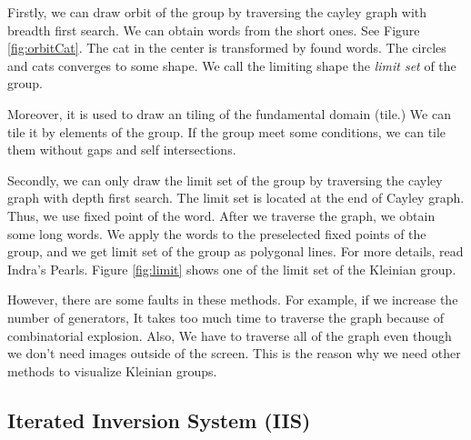 Firstly, we can draw orbit of the group by traversing the cayley graph with
breadth first search. We can obtain words from the short ones.
See Figure \ref{fig:orbitCat}.
The cat in the center is transformed by found words.
The circles and cats converges to some shape.
We call the limiting shape the \textit{limit set} of the group.

Moreover, it is used to draw an tiling of the fundamental domain (tile.)
We can tile it by elements of the group.
If the group meet some conditions, we can tile them without gaps and
self intersections.

Secondly, we can only draw the limit set of the group by traversing the
cayley graph with depth first search.
The limit set is located at the end of Cayley graph. Thus, we use fixed
point of the word. 
After we traverse the graph, we obtain some long words.
We apply the words to the preselected fixed points of the group, and
we get limit set of the group as polygonal lines.
For more details, read Indra's Pearls.
Figure \ref{fig:limit} shows one of the limit set of the Kleinian group.

However, there are some faults in these methods.
For example, if we increase the number of generators,
It takes too much time to traverse the graph because of
combinatorial explosion.
Also, We have to traverse all of the graph
even though we don't need images outside of the screen.
This is the reason why we need other methods to visualize Kleinian
groups.

\subsection{Iterated Inversion System (IIS)}

